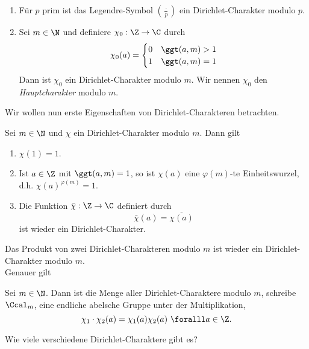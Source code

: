 \begin{exmp*}
	\begin{enumerate}[label={\roman*})]
		\item Für $p$ prim ist das Legendre-Symbol $\left(\frac{\cdot}{p}\right)$ ein Dirichlet-Charakter modulo $p$.
		\item Sei $m \in \N$ und definiere $\chi_0: \Z \to \C$ durch
			\[ \chi_0(a) = \begin{cases}
				0 &\ggt(a,m)>1\\
				1 &\ggt(a,m)=1
			\end{cases} \]
			Dann ist $\chi_0$ ein Dirichlet-Charakter modulo $m$. Wir nennen $\chi_0$ den \emph{Hauptcharakter} modulo $m$.
	\end{enumerate}
\end{exmp*}

Wir wollen nun erste Eigenschaften von Dirichlet-Charakteren betrachten.

\begin{lem}\autolabel
	Sei $m \in \N$ und $\chi$ ein Dirichlet-Charakter modulo $m$. Dann gilt
	\begin{enumerate}[label={\roman*})]
		\item $\chi(1)=1$.
		\item Ist $a \in \Z$ mit $\ggt(a,m)=1$, so ist $\chi(a)$ eine $\varphi(m)$-te Einheitswurzel, d.h. $\chi(a)^{\varphi(m)}=1$.
		\item Die Funktion $\bar{\chi}: \Z \to \C$ definiert durch
			\[ \bar{\chi}(a) = \overbar{\chi(a)} \]
			ist wieder ein Dirichlet-Charakter.
	\end{enumerate}
\end{lem}

\begin{rem*}
	Das Produkt von zwei Dirichlet-Charakteren modulo $m$ ist wieder ein Dirichlet-Charakter modulo $m$.\\
	Genauer gilt
\end{rem*}

\begin{lem}\autolabel
	Sei $m \in \N$. Dann ist die Menge aller Dirichlet-Charaktere modulo $m$, schreibe $\Ccal_m$, eine endliche abelsche Gruppe unter der Multiplikation,
	\[ \chi_1 \cdot \chi_2(a) = \chi_1(a) \chi_2(a) \ \foralll a \in \Z. \]
\end{lem}

\begin{frage*}
	Wie viele verschiedene Dirichlet-Charaktere gibt es?
\end{frage*}

